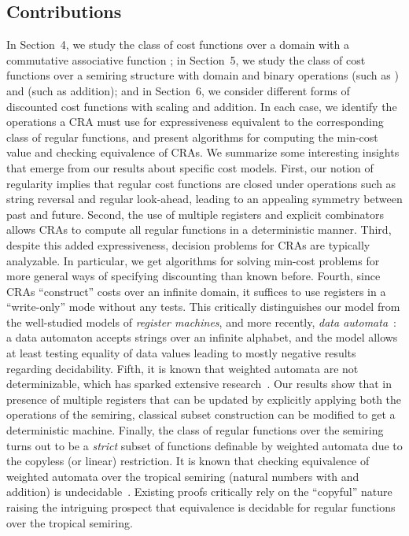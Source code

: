 \documentclass[11pt]{article}
\newcommand{\mypar}[1]{\subsection{#1}}
\begin{document}
\mypar{Contributions}
In Section~4, we study the class of cost functions over a domain
 with a commutative associative function ; in
Section~5, we study the class of cost functions over a semiring
structure with domain  and binary operations  (such
as ) and  (such as addition); and in Section~6, we
consider different forms of discounted cost functions with scaling and
addition.  In each case, we identify the operations a CRA must use for
expressiveness equivalent to the corresponding class of regular
functions, and present algorithms for computing the min-cost value and
checking equivalence of CRAs.  We summarize some interesting insights
that emerge from our results about specific cost models.  First, our
notion of regularity implies that regular cost functions are closed
under operations such as string reversal and regular look-ahead,
leading to an appealing symmetry between past and future.  Second, the
use of multiple registers and explicit combinators allows CRAs to
compute all regular functions in a deterministic manner.  Third,
despite this added expressiveness, decision problems for CRAs are
typically analyzable.  In particular, we get algorithms for solving
min-cost problems for more general ways of specifying discounting than
known before.  Fourth, since CRAs ``construct'' costs over an infinite
domain, it suffices to use registers in a ``write-only'' mode without
any tests.  This critically distinguishes our model from the
well-studied models of {\em register machines}, and more recently,
{\em data
automata\/}~\cite{kaminski_finite_1994,neven_finite_2004,bjorklund_notions_2010}:
a data automaton accepts strings over an infinite alphabet, and the
model allows at least testing equality of data values leading to
mostly negative results regarding decidability.  Fifth, it is known
that weighted automata are not determinizable, which has sparked
extensive research~\cite{mohri_weighted_2009,
kirsten_determinization_2005}.  Our results show that in presence of
multiple registers that can be updated by explicitly applying both the
operations of the semiring, classical subset construction can be
modified to get a deterministic machine.  Finally, the class of
regular functions over the semiring turns out to be a {\em strict\/}
subset of functions definable by weighted automata due to the copyless
(or linear) restriction.  It is known that checking equivalence of
weighted automata over the tropical semiring (natural numbers with
 and addition) is
undecidable~\cite{krob_equality_1992,almagor_what_2011}. Existing
proofs critically rely on the ``copyful'' nature raising the
intriguing prospect that equivalence is decidable for regular
functions over the tropical semiring.
\end{document}
